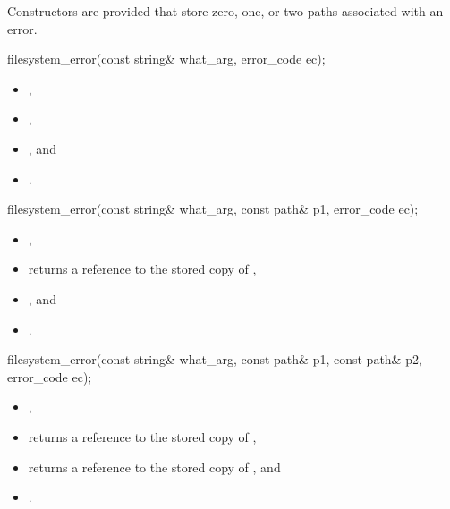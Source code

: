 \pnum
 Constructors are provided that store zero, one, or two paths associated with
an error.

%
\begin{itemdecl}
filesystem_error(const string& what_arg, error_code ec);
\end{itemdecl}

\begin{itemdescr}
\pnum
\ensures
\begin{itemize}
\item {},
\item {},
\item {}, and
\item {} .
\end{itemize}
\end{itemdescr}

%
\begin{itemdecl}
filesystem_error(const string& what_arg, const path& p1, error_code ec);
\end{itemdecl}

\begin{itemdescr}
\pnum
\ensures
\begin{itemize}
\item {},
\item {} returns a reference to the stored copy of ,
\item {}, and
\item {} .
\end{itemize}
\end{itemdescr}

%
\begin{itemdecl}
filesystem_error(const string& what_arg, const path& p1, const path& p2, error_code ec);
\end{itemdecl}

\begin{itemdescr}
\pnum
\ensures
\begin{itemize}
\item {},
\item {} returns a reference to the stored copy of ,
\item {} returns a reference to the stored copy of , and
\item {} .
\end{itemize}
\end{itemdescr}

